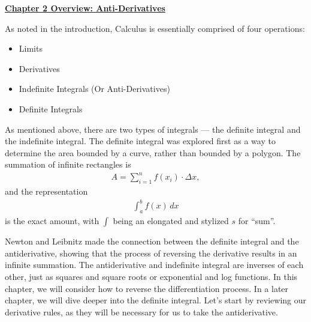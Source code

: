 \textbf{\underline{\large{Chapter 2 Overview: Anti-Derivatives}}} \par

As noted in the introduction, Calculus is essentially comprised of four operations: \begin{itemize}
    \item Limits
    \item Derivatives
    \item Indefinite Integrals (Or Anti-Derivatives)
    \item Definite Integrals
\end{itemize}

As mentioned above, there are two types of integrals --- the definite integral and the indefinite integral. The definite integral was explored first as a way to determine the area bounded by a curve, rather than bounded by a polygon. The summation of infinite rectangles is \begin{align*}
    A = \sum_{i = 1}^n f\left(x_i\right) \cdot \Delta x,
\end{align*}
and the representation \begin{align*}
    \int_a^b f(x) \, dx
\end{align*}
is the exact amount, with $\int$ being an elongated and stylized $s$ for ``sum''. \par

Newton and Leibnitz made the connection between the definite integral and the antiderivative, showing that the process of reversing the derivative results in an infinite summation. The antiderivative and indefinite integral are inverses of each other, just as squares and square roots or exponential and log functions. In this chapter, we will consider how to reverse the differentiation process. In a later chapter, we will dive deeper into the definite integral. Let's start by reviewing our derivative rules, as they will be necessary for us to take the antiderivative. \par


